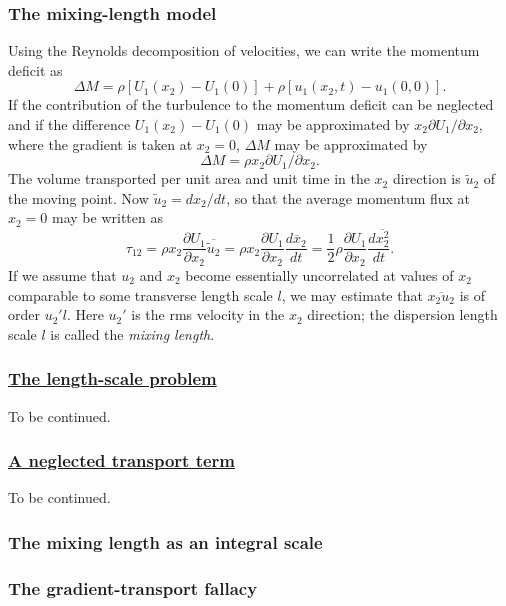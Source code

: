 \documentclass[review]{elsarticle}
\begin{document}
	\subsubsection{The mixing-length model}
		Using the Reynolds decomposition of velocities, we can write the momentum deficit as 
		\begin{equation}\label{MomDeficit2}
			\Delta M = \rho [U_1(x_2)-U_1(0)] + \rho[u_1(x_2,t)-u_1(0,0)].
		\end{equation}
		If the contribution of the turbulence to the momentum deficit can be neglected and if the difference $U_1(x_2)-U_1(0)$ 
		may be approximated by $x_2\partial U_1/\partial x_2$, where the gradient is taken at $x_2 = 0$, $\Delta M$ may be 
		approximated by 
		\begin{equation}
			\Delta M = \rho x_2\partial U_1/\partial x_2.
		\end{equation}  
		The volume transported per unit area and unit time in the $x_2$ direction is $\tilde{u}_2$ of the moving point. Now 
		$\tilde{u}_2=dx_2/dt$, so that the average momentum flux at $x_2=0$ may be written as
		\begin{equation}
			\tau_{12} = \rho x_2 \frac{\partial U_1}{\partial x_2}\overline{\tilde{u}_2} = 
			 \rho x_2 \frac{\partial U_1}{\partial x_2}\frac{d\overline{x}_2}{dt} = 
			 \frac{1}{2}\rho \frac{\partial U_1}{\partial x_2}\frac{d\overline{x_2^2}}{dt}.
		\end{equation}
		If we assume that $u_2$ and $x_2$ become essentially uncorrelated at values of $x_2$ comparable to some transverse 
		length scale $l$, we may estimate that $\overline{x_2u_2}$ is of order $u_2'l$. Here $u_2'$ is the rms velocity in 
		the $x_2$ direction; the dispersion length scale $l$ is called the \textit{mixing length}.
	\subsubsection{\underline{The length-scale problem}}
		To be continued.
	\subsubsection{\underline{A neglected transport term}}
		To be continued.
	\subsubsection{The mixing length as an integral scale}
	\subsubsection{The gradient-transport fallacy}
\end{document}

